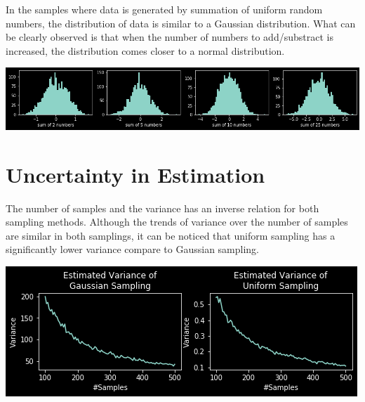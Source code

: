 \documentclass{article}
\begin{document}
In the samples where data is generated by summation of uniform random numbers, the distribution of data is similar to a Gaussian distribution. What can be clearly observed is that when the number of numbers to add/substract is increased, the distribution comes closer to a normal distribution.  
\begin{center}
\includegraphics[scale=0.4]{sum_random_numbers}
\end{center}

\maketitle
\section{Uncertainty in Estimation}
The number of samples and the variance has an inverse relation for both sampling methods. Although the trends of variance over the number of samples are similar in both samplings, it can be noticed that uniform sampling has a significantly lower variance compare to Gaussian sampling.
\begin{center}
\includegraphics[scale=0.5]{estmd_variance}
\end{center}


\maketitle
\end{document}
